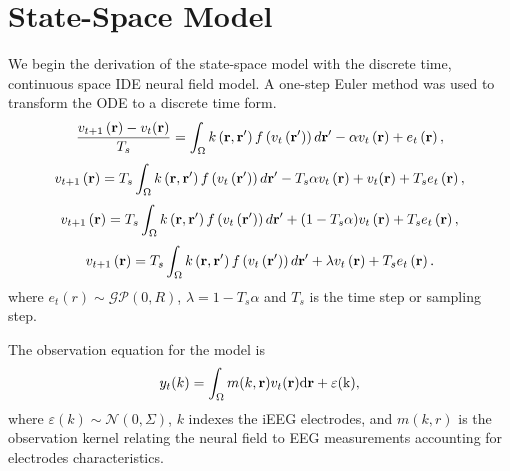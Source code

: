 \documentclass[onecolumn,draftcls]{IEEEtran}
\begin{document}
\section{State-Space Model}
We begin the derivation of the state-space model with the discrete time, continuous space IDE neural field model. A one-step Euler method was used to transform the ODE to a discrete time form.
\begin{equation}\label{SystemEq}
\frac{v_{t + 1}\left( \mathbf{r} \right) - v_t(\mathbf{r})}{T_s} = \int_\Omega  {k\left( {{\bf{r}} , {\bf{r'}}} \right)f\left( {{v_t}\left( \bf{r'} \right)} \right)d{\bf{r'}}}  - \alpha {v_t}\left( {\bf{r}} \right) + e_t\left( {\mathbf{r}} \right),
\end{equation}
\begin{equation}\label{SystemEq}
v_{t + 1}\left( \mathbf{r} \right)  = T_s\int_\Omega  {k\left( {{\bf{r}} , {\bf{r'}}} \right)f\left( {{v_t}\left( \bf{r'} \right)} \right)d{\bf{r'}}} - T_s\alpha {v_t}\left( {\bf{r}} \right) + v_t(\mathbf{r}) + T_se_t\left( {\mathbf{r}} \right),
\end{equation}
\begin{equation}\label{SystemEq}
v_{t + 1}\left( \mathbf{r} \right)  = T_s\int_\Omega  {k\left( {{\bf{r}} , {\bf{r'}}} \right)f\left( {{v_t}\left( \mathbf{r'} \right)} \right)d{\bf{r'}}} + (1 - T_s\alpha) v_t\left( {\bf{r}} \right) + T_se_t\left( {\mathbf{r}} \right),
\end{equation}
\begin{equation}\label{SystemEq}
v_{t + 1}\left( \mathbf{r} \right)  = T_s\int_\Omega  {k\left( {{\bf{r}} , {\bf{r'}}} \right)f\left( {{v_t}\left( \bf{r'} \right)} \right)d{\bf{r'}}} + \lambda v_t\left( {\bf{r}} \right) + T_se_t\left( {\mathbf{r}} \right).
\end{equation}
where $e_t(r)\sim \mathcal{GP}(0,R)$, $\lambda = 1-T_s\alpha$ and $T_s$ is the time step or sampling step.

The observation equation for the model is
\begin{equation}\label{ObservationEquation}
    y_t( k ) = \int_\Omega  m( k,\mathbf{r} )v_t( \mathbf{r}\rm ) d\mathbf{r}  + \varepsilon ( k ),
\end{equation}
where $\varepsilon( k )\sim\mathcal{N}(0,\Sigma)$, $k$ indexes the iEEG electrodes, and $m(k,r)$ is the observation kernel relating the neural field to EEG measurements accounting for electrodes characteristics.
\end{document}
